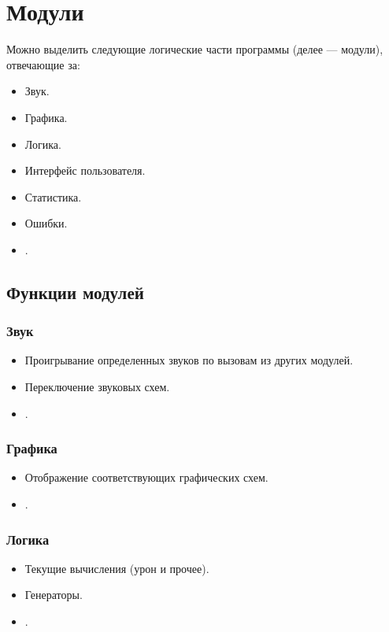 \documentclass[12pt,a4paper,fullpage]{article}
\begin{document}
\tableofcontents
\newpage

\section{Модули}
Можно выделить следующие логические части программы (делее --- модули), отвечающие за:
\begin{itemize}
	\item Звук.
	\item Графика.
	\item Логика.
	\item Интерфейс пользователя.
	\item Статистика.
	\item Ошибки.
	\item .\\
\end{itemize}

\subsection{Функции модулей}
\subsubsection{Звук}
\begin{itemize}
	\item Проигрывание определенных звуков по вызовам из других модулей.
	\item Переключение звуковых схем.
	\item .\\
\end{itemize}

\subsubsection{Графика}
\begin{itemize}
	\item Отображение соответствующих графических схем.
	\item .\\
\end{itemize}

\subsubsection{Логика}
\begin{itemize}
	\item Текущие вычисления (урон и прочее).
	\item Генераторы.
	\item .\\
\end{itemize}
\end{document}
